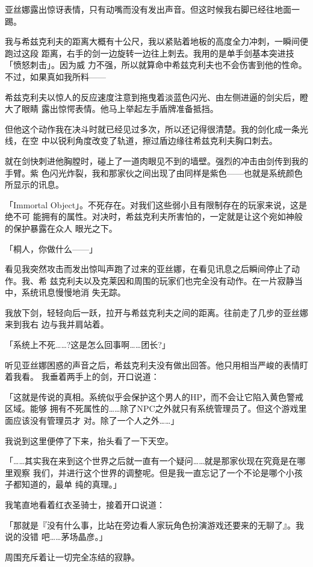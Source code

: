 \documentclass[11pt]{book}
\begin{document}
亚丝娜露出惊讶表情，只有动嘴而没有发出声音。但这时候我右脚已经往地面一踢。

我与希兹克利夫的距离大概有十公尺，我以紧贴着地板的高度全力冲刺，一瞬间便跑过这段
距离，右手的剑一边旋转一边往上刺去。我用的是单手剑基本突进技「愤怒刺击」。因为威
力不强，所以就算命中希兹克利夫也不会伤害到他的性命。不过，如果真如我所料——

希兹克利夫以惊人的反应速度注意到拖曳着淡蓝色闪光、由左侧进逼的剑尖后，瞪大了眼睛
露出惊愕表情。他马上举起左手盾牌准备抵挡。

但他这个动作我在决斗时就已经见过多次，所以还记得很清楚。我的剑化成一条光线，在空
中以锐利角度改变了轨道，擦过盾边缘往希兹克利夫胸口刺去。

就在剑快刺进他胸膛时，碰上了一道肉眼见不到的墙壁。强烈的冲击由剑传到我的手臂。紫
色闪光炸裂，我和那家伙之间出现了由同样是紫色——也就是系统颜色所显示的讯息。

「Immortal Object」。不死存在。对我们这些弱小且有限制存在的玩家来说，这是绝不可
能拥有的属性。对决时，希兹克利夫所害怕的，一定就是让这个宛如神般的保护暴露在众人
眼光之下。

「桐人，你做什么——」

看见我突然攻击而发出惊叫声跑了过来的亚丝娜，在看见讯息之后瞬间停止了动作。我、希
兹克利夫以及克莱因和周围的玩家们也完全没有动作。在一片寂静当中，系统讯息慢慢地消
失无踪。

我放下剑，轻轻向后一跃，拉开与希兹克利夫之间的距离。往前走了几步的亚丝娜来到我右
边与我并肩站着。

「系统上不死……?这是怎么回事啊……团长?」

听见亚丝娜困惑的声音之后，希兹克利夫没有做出回答。他只用相当严峻的表情盯着我看。
我垂着两手上的剑，开口说道：

「这就是传说的真相。系统似乎会保护这个男人的HP，而不会让它陷入黄色警戒区域。能够
拥有不死属性的……除了NPC之外就只有系统管理员了。但这个游戏里面应该没有管理员才
对。除了一个人之外……」

我说到这里便停了下来，抬头看了一下天空。

「……其实我在来到这个世界之后就一直有一个疑问……就是那家伙现在究竟是在哪里观察
我们，并进行这个世界的调整呢。但是我一直忘记了一个不论是哪个小孩子都知道的，最单
纯的真理。」

我笔直地看着红衣圣骑士，接着开口说道：

「那就是『没有什么事，比站在旁边看人家玩角色扮演游戏还要来的无聊了』。我说的没错
吧……茅场晶彦。」

周围充斥着让一切完全冻结的寂静。
\end{document}
